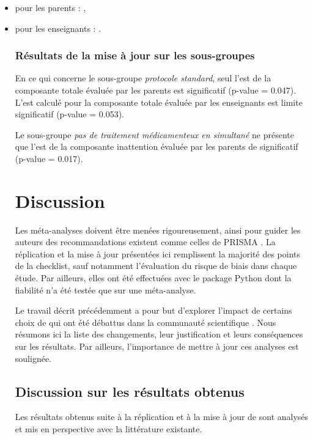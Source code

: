 \begin{itemize}
\item pour les parents : \citet{Christiansen2014}, 
\item pour les enseignants : \citet{Moreno2019, Shereena2019}. 

 
\subsubsection{Résultats de la mise à jour sur les sous-groupes}
 
En ce qui concerne le sous-groupe \emph{protocole standard}, seul l'\gls{est} de la composante totale évaluée par les parents est significatif (p-value = 0.047). 
L'\gls{est} calculé pour la composante totale évaluée par les enseignants est limite significatif (p-value = 0.053).

Le sous-groupe \emph{pas de traitement médicamenteux en simultané} ne présente que l'\gls{est} de la composante inattention évaluée par les parents de 
significatif (p-value = 0.017).

\section{Discussion} 

Les méta-analyses doivent être menées rigoureusement, ainsi pour guider les auteurs des recommandations existent comme celles de PRISMA \citep{Moher2009}.
La réplication et la mise à jour présentées ici remplissent la majorité des points de la checklist, sauf notamment l'évaluation du risque de biais dans chaque étude.
Par ailleurs, elles ont été effectuées avec le package Python dont la fiabilité n'a été testée que sur une méta-analyse.
 
Le travail décrit précédemment a pour but d'explorer l'impact de certains choix de \citet{Cortese2016} qui ont été débattus dans la communauté scientifique 
\citep{Micoulaud2016}. Nous résumons ici la liste des changements, leur justification et leurs conséquences sur les résultats. Par ailleurs, l'importance de mettre 
à jour ces analyses est soulignée.

\subsection{Discussion sur les résultats obtenus} \label{replication_and_update}

Les résultats obtenus suite à la réplication et à la mise à jour de \citet{Cortese2016} sont analysés et mis en perspective avec la littérature existante.


\end{itemize}
